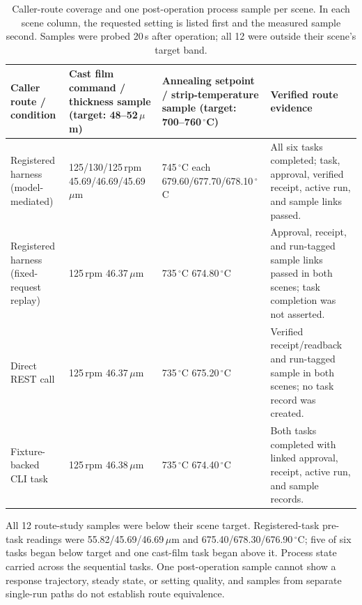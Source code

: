 \begin{table}[!t]
\centering
\caption{Caller-route coverage and one post-operation process sample per scene. In
each scene column, the requested setting is listed first and the measured
sample second. Samples were probed 20\,s after operation; all 12 were outside
their scene's target band.}
\label{tab:route-matrix}
\footnotesize
\setlength{\tabcolsep}{4pt}
\begin{tabularx}{\textwidth}{@{}>{\raggedright\arraybackslash}p{2.6cm}XX>{\raggedright\arraybackslash}p{5.2cm}@{}}
\toprule
Caller route / condition & \shortstack[l]{Cast film\\command / thickness sample\\(target: 48--52\,$\mu$m)} &
\shortstack[l]{Annealing\\setpoint / strip-temperature sample\\(target: 700--760\,$^{\circ}$C)} &
Verified route evidence \\
\midrule
Registered harness (model-mediated) &
\shortstack[l]{125/130/125\,rpm\\45.69/46.69/45.69\,$\mu$m} &
\shortstack[l]{745\,$^{\circ}$C each\\679.60/677.70/678.10\,$^{\circ}$C} &
All six tasks completed; task, approval, verified receipt, active run, and
sample links passed. \\
Registered harness (fixed-request replay) &
\shortstack[l]{125\,rpm\\46.37\,$\mu$m} &
\shortstack[l]{735\,$^{\circ}$C\\674.80\,$^{\circ}$C} &
Approval, receipt, and run-tagged sample links passed in both scenes; task
completion was not asserted. \\
Direct REST call &
\shortstack[l]{125\,rpm\\46.37\,$\mu$m} &
\shortstack[l]{735\,$^{\circ}$C\\675.20\,$^{\circ}$C} &
Verified receipt/readback and run-tagged sample in both scenes; no task record
was created. \\
Fixture-backed CLI task &
\shortstack[l]{125\,rpm\\46.38\,$\mu$m} &
\shortstack[l]{735\,$^{\circ}$C\\674.40\,$^{\circ}$C} &
Both tasks completed with linked approval, receipt, active run, and sample
records. \\
\bottomrule
\end{tabularx}
\end{table}

All 12 route-study samples were below their scene target. Registered-task
pre-task readings were 55.82/45.69/46.69\,$\mu$m and
675.40/678.30/676.90\,$^{\circ}$C; five of six tasks began below target and
one cast-film task began above it. Process state carried across the sequential
tasks. One post-operation sample cannot show a response trajectory, steady
state, or setting quality, and samples from separate single-run paths do not
establish route equivalence.




